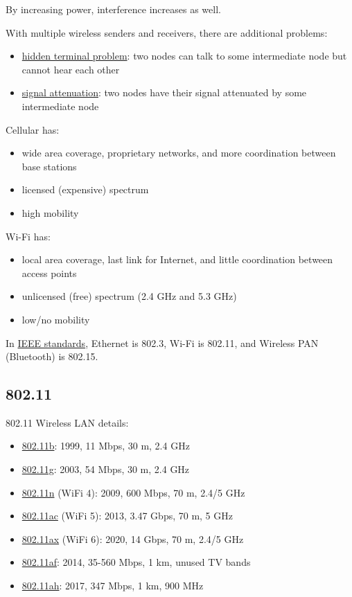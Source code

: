 \documentclass[11pt]{article}
\begin{document}
By increasing power, interference increases as well.

With multiple wireless senders and receivers, there are additional problems:
\begin{itemize}
\item \uline{hidden terminal problem}: two nodes can talk to some intermediate node but cannot hear each other
\item \uline{signal attenuation}: two nodes have their signal attenuated by some intermediate node
\end{itemize}

Cellular has:
\begin{itemize}
\item wide area coverage, proprietary networks, and more coordination between base stations
\item licensed (expensive) spectrum
\item high mobility
\end{itemize}

Wi-Fi has:
\begin{itemize}
\item local area coverage, last link for Internet, and little coordination between access points
\item unlicensed (free) spectrum (2.4 GHz and 5.3 GHz)
\item low/no mobility
\end{itemize}

In \uline{IEEE standards}, Ethernet is 802.3, Wi-Fi is 802.11, and Wireless PAN (Bluetooth) is 802.15.
\subsection{802.11}
\label{sec:orgf62fbd0}

802.11 Wireless LAN details:
\begin{itemize}
\item \uline{802.11b}: 1999, 11 Mbps, 30 m, 2.4 GHz
\item \uline{802.11g}: 2003, 54 Mbps, 30 m, 2.4 GHz
\item \uline{802.11n} (WiFi 4): 2009, 600 Mbps, 70 m, 2.4/5 GHz
\item \uline{802.11ac} (WiFi 5): 2013, 3.47 Gbps, 70 m, 5 GHz
\item \uline{802.11ax} (WiFi 6): 2020, 14 Gbps, 70 m, 2.4/5 GHz
\item \uline{802.11af}: 2014, 35-560 Mbps, 1 km, unused TV bands
\item \uline{802.11ah}: 2017, 347 Mbps, 1 km, 900 MHz
\end{itemize}
\end{document}
